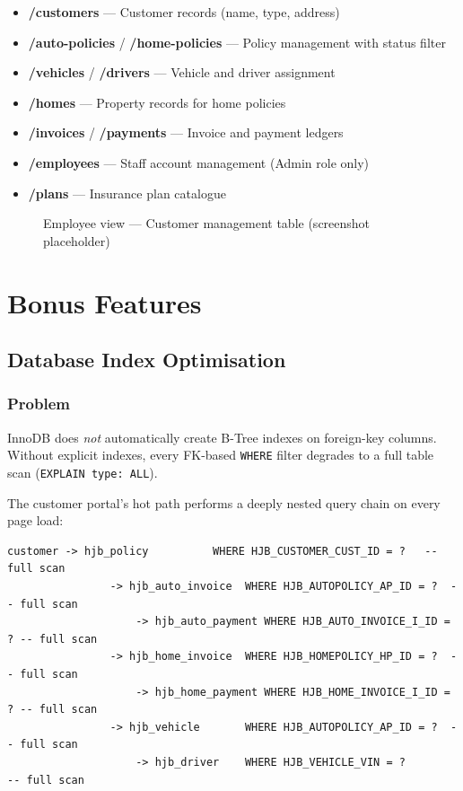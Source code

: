 \documentclass[12pt,letterpaper]{article}
\begin{document}
\begin{itemize}
  \item \textbf{/customers} --- Customer records (name, type, address)
  \item \textbf{/auto-policies} / \textbf{/home-policies} --- Policy management with status filter
  \item \textbf{/vehicles} / \textbf{/drivers} --- Vehicle and driver assignment
  \item \textbf{/homes} --- Property records for home policies
  \item \textbf{/invoices} / \textbf{/payments} --- Invoice and payment ledgers
  \item \textbf{/employees} --- Staff account management (Admin role only)
  \item \textbf{/plans} --- Insurance plan catalogue
\end{itemize}

\begin{figure}[H]
  \centering
  \fbox{\rule{0pt}{5cm}\rule{0.8\linewidth}{0pt}}
  \caption{Employee view --- Customer management table (screenshot placeholder)}
\end{figure}

\section{Bonus Features}
\label{sec:bonus}

\subsection{Database Index Optimisation}
\label{sec:indexes}

\subsubsection*{Problem}

InnoDB does \emph{not} automatically create B-Tree indexes on foreign-key columns. Without explicit indexes, every FK-based \texttt{WHERE} filter degrades to a full table scan (\texttt{EXPLAIN type: ALL}).

The customer portal's hot path performs a deeply nested query chain on every page load:

\begin{lstlisting}[language={},numbers=none,caption={Portal hot-path query chain (before indexing)}]
customer -> hjb_policy          WHERE HJB_CUSTOMER_CUST_ID = ?   -- full scan
                -> hjb_auto_invoice  WHERE HJB_AUTOPOLICY_AP_ID = ?  -- full scan
                    -> hjb_auto_payment WHERE HJB_AUTO_INVOICE_I_ID = ? -- full scan
                -> hjb_home_invoice  WHERE HJB_HOMEPOLICY_HP_ID = ?  -- full scan
                    -> hjb_home_payment WHERE HJB_HOME_INVOICE_I_ID = ? -- full scan
                -> hjb_vehicle       WHERE HJB_AUTOPOLICY_AP_ID = ?  -- full scan
                    -> hjb_driver    WHERE HJB_VEHICLE_VIN = ?        -- full scan
\end{lstlisting}
\end{document}
